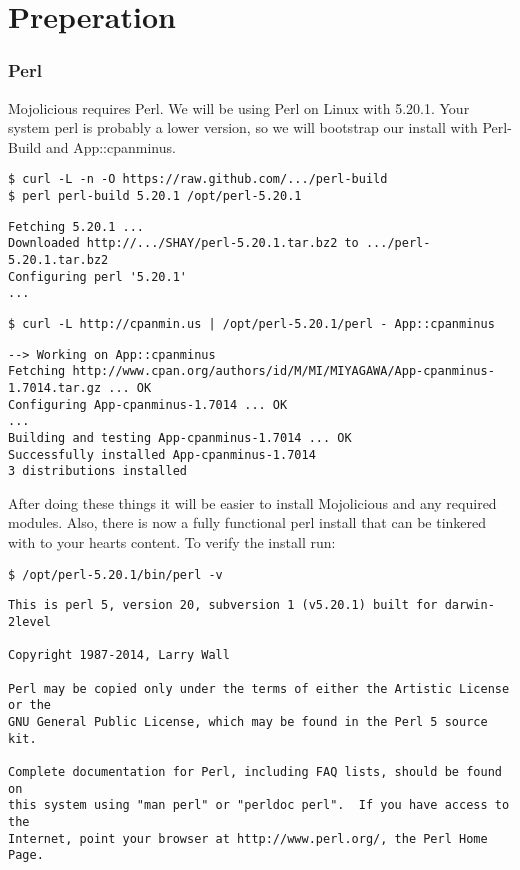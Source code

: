 \documentclass[16pt,pdftex]{book}
\begin{document}
\chapter*{Preperation}

\subsection{Perl}

Mojolicious requires Perl.  We will be using Perl on Linux with 5.20.1.  Your
system perl is probably a lower version, so we will bootstrap our install with 
Perl-Build and App::cpanminus.

\begin{lstlisting}[style=BashInputStyle]
$ curl -L -n -O https://raw.github.com/.../perl-build
$ perl perl-build 5.20.1 /opt/perl-5.20.1
\end{lstlisting}

\begin{lstlisting}[style=BashOutputStyle]
Fetching 5.20.1 ...
Downloaded http://.../SHAY/perl-5.20.1.tar.bz2 to .../perl-5.20.1.tar.bz2
Configuring perl '5.20.1'
...
\end{lstlisting}

\begin{lstlisting}[style=BashInputStyle]
$ curl -L http://cpanmin.us | /opt/perl-5.20.1/perl - App::cpanminus
\end{lstlisting}

\begin{lstlisting}[style=BashOutputStyle]
--> Working on App::cpanminus
Fetching http://www.cpan.org/authors/id/M/MI/MIYAGAWA/App-cpanminus-1.7014.tar.gz ... OK
Configuring App-cpanminus-1.7014 ... OK
...
Building and testing App-cpanminus-1.7014 ... OK
Successfully installed App-cpanminus-1.7014
3 distributions installed
\end{lstlisting}

After doing these things it will be easier to install Mojolicious and any required modules.
Also, there is now a fully functional perl install that can be tinkered with to your hearts content.
To verify the install run:

\begin{lstlisting}[style=BashInputStyle]
$ /opt/perl-5.20.1/bin/perl -v
\end{lstlisting}

\begin{lstlisting}[style=BashOutputStyle]
This is perl 5, version 20, subversion 1 (v5.20.1) built for darwin-2level

Copyright 1987-2014, Larry Wall

Perl may be copied only under the terms of either the Artistic License or the
GNU General Public License, which may be found in the Perl 5 source kit.

Complete documentation for Perl, including FAQ lists, should be found on
this system using "man perl" or "perldoc perl".  If you have access to the
Internet, point your browser at http://www.perl.org/, the Perl Home Page.
\end{lstlisting}
\end{document}
